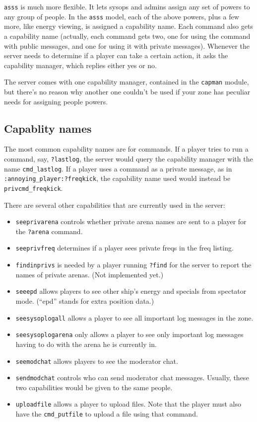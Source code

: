 \documentclass{article}
\newcommand{\asss}{\texttt{asss}}
\begin{document}
\asss{} is much more flexible. It lets sysops and admins assign any set
of powers to any group of people. In the \asss{} model, each of the
above powers, plus a few more, like energy viewing, is assigned a
capability name. Each command also gets a capability name (actually,
each command gets two, one for using the command with public messages,
and one for using it with private messages). Whenever the server needs
to determine if a player can take a certain action, it asks the
capability manager, which replies either yes or no.

The server comes with one capability manager, contained in the
\texttt{capman} module, but there's no reason why another one couldn't
be used if your zone has peculiar needs for assigning people powers.

\subsection{Capablity names}

The most common capability names are for commands. If a player tries
to run a command, say, \verb/?lastlog/, the server would query the
capability manager with the name \verb/cmd_lastlog/. If a player uses a
command as a private message, as in \verb/:annoying_player:?freqkick/,
the capability name used would instead be \verb/privcmd_freqkick/.

There are several other capabilities that are currently used in the
server:

\begin{itemize}
\item{\texttt{seeprivarena}} controls whether private arena names are
sent to a player for the \verb/?arena/ command.
\item{\texttt{seeprivfreq}} determines if a player sees private freqs in
the freq listing.
\item{\texttt{findinprivs}} is needed by a player running \verb/?find/
for the server to report the names of private arenas. (Not implemented
yet.)
\item{\texttt{seeepd}} allows players to see other ship's energy and
specials from spectator mode. (``epd'' stands for extra position data.)
\item{\texttt{seesysoplogall}} allows a player to see all important log
messages in the zone.
\item{\texttt{seesysoplogarena}} only allows a player to see only
important log messages having to do with the arena he is currently in.
\item{\texttt{seemodchat}} allows players to see the moderator chat.
\item{\texttt{sendmodchat}} controls who can send moderator chat
messages. Usually, these two capabilities would be given to the same
people.
\item{\texttt{uploadfile}} allows a player to upload files. Note that
the player must also have the \texttt{cmd\_putfile} to upload a file
using that command.
\end{itemize}
\end{document}
